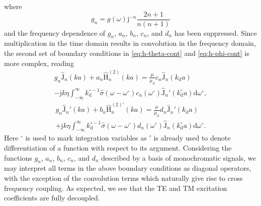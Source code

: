 \documentclass[article]{IEEEtran}
\newcommand{\T}[1]{\mathrm{#1}}
\newcommand{\Jh}{\hat{\T{J}}}
\newcommand{\Hh}{\hat{\T{H}}^{(2)}}
\newcommand{\Hhp}{\hat{\T{H}}^{(2)\prime}}
\begin{document}
where 
\begin{equation}
    g_n = g(\omega)\T{j}^{-n}\frac{2n+1}{n(n+1)}
\end{equation}
and the frequency dependence of $g_n$, $a_n$, $b_n$, $c_n$, and $d_n$ has been suppressed.  Since multiplication in the time domain results in convolution in the frequency domain, the second set of boundary conditions in \eqref{eq:h-theta-cont} and \eqref{eq:h-phi-cont} is more complex, reading 
\begin{multline}
    g_n\Jh_n(ka)+a_n\Hh_n(ka) = \frac{\mu}{\mu_\T{d}}c_n \Jh_n(k_\T{d}a) \\- \T{j} k\eta\int_{-\infty}^\infty k_\T{d}^{\circ-1} \hat{\sigma}(\omega-\omega^\circ)c_n(\omega^\circ)\Jh_n'(k^\circ_\T{d}a) \T{d}\omega^\circ,
    \label{eq:bc-h-tm}
\end{multline}
\begin{multline}
    g_n\Jh_n'(ka)+b_n\Hhp_n(ka) = \frac{\mu}{\mu_\T{d}}d_n \Jh_n'(k_\T{d}a) \\+ \T{j} k\eta\int_{-\infty}^\infty k_\T{d}^{\circ-1} \hat{\sigma}(\omega-\omega^\circ)d_n(\omega^\circ)\Jh_n(k^\circ_\T{d}a) \T{d}\omega^\circ.
\end{multline}
Here $^\circ$ is used to mark integration variables as $'$ is already used to denote differentiation of a function with respect to its argument.  Considering the functions $g_n$, $a_n$, $b_n$, $c_n$, and $d_n$ described by a basis of monochromatic signals, we may interpret all terms in the above boundary conditions as diagonal operators, with the exception of the convolution terms which naturally give rise to cross frequency coupling.  As expected, we see that the TE and TM excitation coefficients are fully decoupled.  
\end{document}
